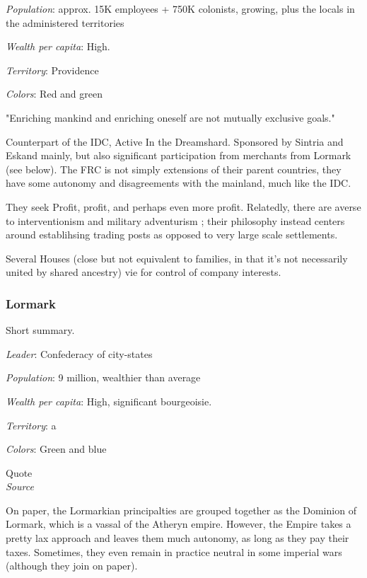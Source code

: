 \textit{Population}: approx. 15K employees + 750K colonists, growing, plus the locals in the administered territories

\textit{Wealth per capita}: High.

\textit{Territory}: Providence
    
\textit{Colors}: Red and green


\begin{rpg-quotebox}
"Enriching mankind and enriching oneself are not mutually exclusive goals."
\end{rpg-quotebox}


Counterpart of the IDC, Active In the Dreamshard. Sponsored by Sintria and Eskand mainly, but also significant participation from merchants from Lormark (see below).  
The FRC is not simply extensions of their parent countries, they have some autonomy and disagreements with the mainland, much like the IDC.

They seek Profit, profit, and perhaps even more profit. Relatedly, there are averse to interventionism and military adventurism ; their philosophy instead centers around establihsing trading posts as opposed to very large scale settlements.

Several Houses (close but not equivalent to families, in that it's not necessarily united by shared ancestry) vie for control of company interests.



\subsubsection{Lormark}

Short summary.

\textit{Leader}: Confederacy of city-states

\textit{Population}: 9 million, wealthier than average

\textit{Wealth per capita}: High, significant bourgeoisie.

\textit{Territory}: a
    
\textit{Colors}: Green and blue


\begin{rpg-quotebox}
Quote \\ \textendash \textit{Source}
\end{rpg-quotebox}

On paper, the Lormarkian principalties are grouped together as the Dominion of Lormark, which is a vassal of the Atheryn empire. However, the Empire takes a pretty lax approach and leaves them much autonomy, as long as they pay their taxes. Sometimes, they even remain in practice neutral in some imperial wars (although they join on paper). 

